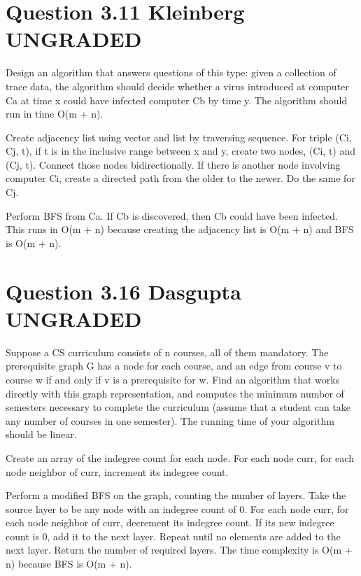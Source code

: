 \documentclass[11pt, oneside]{article}
\begin{document}
\section{Question 3.11 Kleinberg UNGRADED}
Design an algorithm that answers questions of this type: given a collection of trace data, the algorithm should decide whether a virus introduced at computer Ca at time x could have infected computer Cb by time y. The algorithm should run in time O(m + n). \newline

Create adjacency list using vector and list by traversing sequence. For triple (Ci, Cj, t), if t is in the inclusive range between x and y, create two nodes, (Ci, t) and (Cj, t). Connect those nodes bidirectionally. If there is another node involving computer Ci, create a directed path from the older to the newer. Do the same for Cj. \newline

Perform BFS from Ca. If Cb is discovered, then Cb could have been infected. This runs in O(m + n) because creating the adjacency list is O(m + n) and BFS is O(m + n). \newline

\clearpage

\section{Question 3.16 Dasgupta UNGRADED}
Suppose a CS curriculum consists of n courses, all of them mandatory. The prerequisite graph G has a node for each course, and an edge from course v to course w if and only if v is a prerequisite for w. Find an algorithm that works directly with this graph representation, and computes the minimum number of semesters necessary to complete the curriculum (assume that a student can take any number of courses in one semester). The running time of your algorithm should be linear. \newline

Create an array of the indegree count for each node. For each node curr, for each node neighbor of curr, increment its indegree count. \newline

Perform a modified BFS on the graph, counting the number of layers. Take the source layer to be any node with an indegree count of 0. For each node curr, for each node neighbor of curr, decrement its indegree count. If its new indegree count is 0, add it to the next layer. Repeat until no elements are added to the next layer. Return the number of required layers. The time complexity is O(m + n) because BFS is O(m + n). \newline

\clearpage
\end{document}
